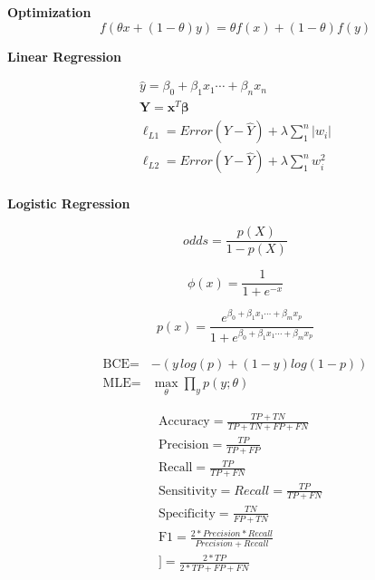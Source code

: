 \documentclass[fleqn,9pt]{article}
\begin{document}
\begin{minipage}[t]{0.33\textwidth}



\textbf{Optimization}
\begin{equation*}
	f(\theta x + (1-\theta)y) = \theta f(x) + (1-\theta)f(y)
\end{equation*}

\textbf{Linear Regression}

\begin{equation*}
\begin{split}
	\hat{y} = \beta_0 + \beta_1 x_1 \cdots + \beta_n x_n \\
	\boldsymbol{Y} = \boldsymbol{x}^T \boldsymbol{\beta} \\
   \ell_{L1} = Error(Y - \widehat{Y}) + \lambda \sum_1^n |w_i|\\
   \ell_{L2} = Error(Y - \widehat{Y}) +  \lambda \sum_1^n w_i^{2}\\
\end{split}		
\end{equation*}

\textbf{Logistic Regression}

\begin{equation*}
odds = \frac{p(X)}{1-p(X)}
\end{equation*}


\begin{equation*}
	\phi(x) = \frac{1}{1+e^{-x}}
\end{equation*}


\begin{equation*}
	p(x) = \frac{e^{\beta_0 + \beta_1 x_1 \cdots + \beta_m x_p}}{1+e^{\beta_0 + \beta_1 x_1 \cdots + \beta_m x_p}}
\end{equation*}

\begin{equation*}
\begin{split}
\text{BCE} =& -(y\,log(p)+(1-y)log(1-p))\\
\text{MLE} =& \max_{\theta} \prod_y p(y;\theta)
\end{split}
\end{equation*}


\begin{equation*}
\begin{split}
&\text{Accuracy} = \frac{TP+TN}{TP+TN+FP+FN}\\
&\text{Precision} = \frac{TP}{TP+FP}\\
&\text{Recall} = \frac{TP}{TP+FN}\\
&\text{Sensitivity} = Recall = \frac{TP}{TP+FN}\\
&\text{Specificity} = \frac{TN}{FP+TN}\\
&\text{F1} = \frac{2*Precision*Recall}{Precision+Recall} \\
&]= \frac{2*TP}{2*TP+FP+FN}
\end{split}
\end{equation*}

\end{minipage}%
\end{document}
